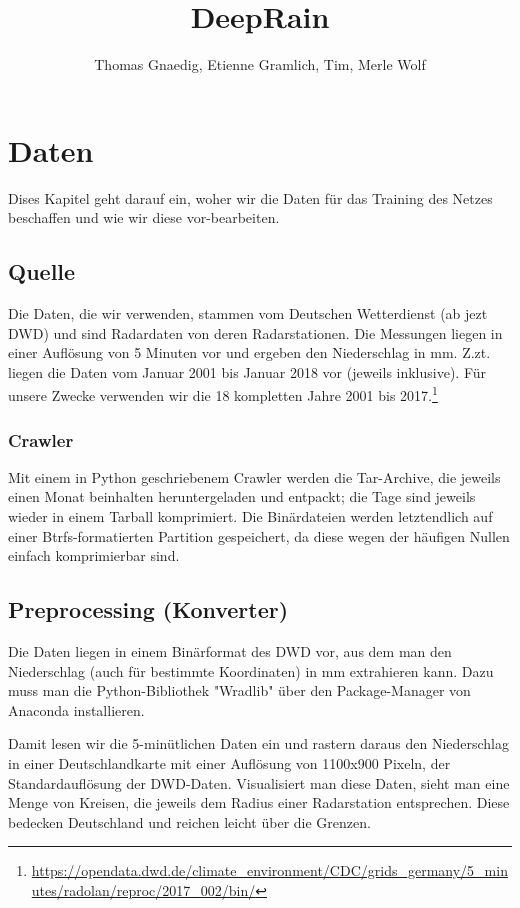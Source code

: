 \documentclass[11pt]{article}
\title{DeepRain}
\author{Thomas Gnaedig, Etienne Gramlich, Tim, Merle Wolf}
\begin{document}
\maketitle
\tableofcontents

\section{Daten}
Dises Kapitel geht darauf ein, woher wir die Daten für das Training des Netzes beschaffen und wie wir diese vor-bearbeiten.

\subsection{Quelle}
Die Daten, die wir verwenden, stammen vom Deutschen Wetterdienst (ab jezt DWD) und sind Radardaten von deren Radarstationen. Die Messungen liegen in einer Auflösung von 5 Minuten vor und ergeben den Niederschlag in mm. Z.zt. liegen die Daten vom Januar 2001 bis Januar 2018 vor (jeweils inklusive). Für unsere Zwecke verwenden wir die 18 kompletten Jahre 2001 bis 2017.\footnote{\url{https://opendata.dwd.de/climate\_environment/CDC/grids\_germany/5\_minutes/radolan/reproc/2017\_002/bin/}}

\subsubsection{Crawler}
Mit einem in Python geschriebenem Crawler werden die Tar-Archive, die jeweils einen Monat beinhalten heruntergeladen und entpackt; die Tage sind jeweils wieder in einem Tarball komprimiert. Die Binärdateien werden letztendlich auf einer Btrfs-formatierten Partition gespeichert, da diese wegen der häufigen Nullen einfach komprimierbar sind.

\subsection{Preprocessing (Konverter)}
Die Daten liegen in einem Binärformat des DWD vor, aus dem man den Niederschlag (auch für bestimmte Koordinaten) in mm extrahieren kann. Dazu muss man die Python-Bibliothek "Wradlib" über den Package-Manager von Anaconda installieren.

Damit lesen wir die 5-minütlichen Daten ein und rastern daraus den Niederschlag in einer Deutschlandkarte mit einer Auflösung von 1100x900 Pixeln, der Standardauflösung der DWD-Daten. Visualisiert man diese Daten, sieht man eine Menge von Kreisen, die jeweils dem Radius einer Radarstation entsprechen. Diese bedecken Deutschland und reichen leicht über die Grenzen.
\end{document}
